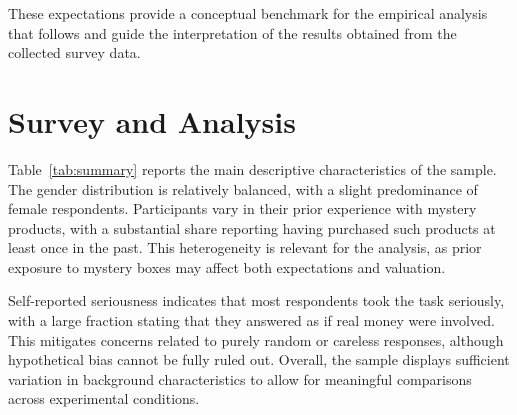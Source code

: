 \documentclass{article}
\begin{document}
These expectations provide a conceptual benchmark for the empirical analysis that follows and guide the interpretation of the results obtained from the collected survey data.

\section{Survey and Analysis}


Table~\ref{tab:summary} reports the main descriptive characteristics of the sample. The gender distribution is relatively balanced, with a slight predominance of female respondents. Participants vary in their prior experience with mystery products, with a substantial share reporting having purchased such products at least once in the past. This heterogeneity is relevant for the analysis, as prior exposure to mystery boxes may affect both expectations and valuation.

Self-reported seriousness indicates that most respondents took the task seriously, with a large fraction stating that they answered as if real money were involved. This mitigates concerns related to purely random or careless responses, although hypothetical bias cannot be fully ruled out. Overall, the sample displays sufficient variation in background characteristics to allow for meaningful comparisons across experimental conditions.
\end{document}
